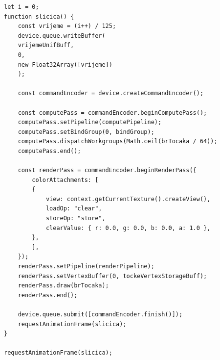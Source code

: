 \documentclass{foi}
\begin{document}
\begin{verbatim}
let i = 0;
function slicica() {
	const vrijeme = (i++) / 125;
	device.queue.writeBuffer(
	vrijemeUnifBuff,
	0,
	new Float32Array([vrijeme])
	);
	
	const commandEncoder = device.createCommandEncoder();
	
	const computePass = commandEncoder.beginComputePass();
	computePass.setPipeline(computePipeline);
	computePass.setBindGroup(0, bindGroup);
	computePass.dispatchWorkgroups(Math.ceil(brTocaka / 64));
	computePass.end();
	
	const renderPass = commandEncoder.beginRenderPass({
		colorAttachments: [
		{
			view: context.getCurrentTexture().createView(),
			loadOp: "clear",
			storeOp: "store",
			clearValue: { r: 0.0, g: 0.0, b: 0.0, a: 1.0 },
		},
		],
	});
	renderPass.setPipeline(renderPipeline);
	renderPass.setVertexBuffer(0, tockeVertexStorageBuff);
	renderPass.draw(brTocaka);
	renderPass.end();
	
	device.queue.submit([commandEncoder.finish()]);
	requestAnimationFrame(slicica);
}

requestAnimationFrame(slicica);
\end{verbatim}
\end{document}
